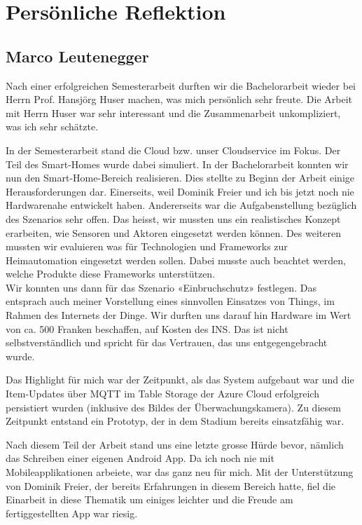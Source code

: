 \pagebreak
\section{Persönliche Reflektion}

\subsection*{Marco Leutenegger}
Nach einer erfolgreichen Semesterarbeit durften wir die Bachelorarbeit wieder bei Herrn Prof. Hansjörg Huser machen, was mich persönlich sehr freute. Die Arbeit mit Herrn Huser war sehr interessant und die Zusammenarbeit unkompliziert, was ich sehr schätzte.

In der Semesterarbeit stand die Cloud bzw. unser Cloudservice im Fokus. Der Teil des Smart-Homes wurde dabei simuliert. In der Bachelorarbeit konnten wir nun den Smart-Home-Bereich realisieren. Dies stellte zu Beginn der Arbeit einige Herausforderungen dar. Einerseits, weil Dominik Freier und ich bis jetzt noch nie Hardwarenahe entwickelt haben. Andererseits war die Aufgabenstellung bezüglich des Szenarios sehr offen. Das heisst, wir mussten uns ein realistisches Konzept erarbeiten, wie Sensoren und Aktoren eingesetzt werden können. Des weiteren mussten wir evaluieren was für Technologien und Frameworks zur Heimautomation eingesetzt werden sollen. Dabei musste auch beachtet werden, welche Produkte diese Frameworks unterstützen. \\
Wir konnten uns dann für das Szenario «Einbruchschutz» festlegen. Das entsprach auch meiner Vorstellung eines sinnvollen Einsatzes von Things, im Rahmen des Internets der Dinge. Wir durften uns darauf hin Hardware im Wert von ca. 500 Franken beschaffen, auf Kosten des INS. Das ist nicht selbstverständlich und spricht für das Vertrauen, das uns entgegengebracht wurde.

Das Highlight für mich war der Zeitpunkt, als das System aufgebaut war und die Item-Updates über MQTT im Table Storage der Azure Cloud erfolgreich persistiert wurden (inklusive des Bildes der Überwachungskamera). Zu diesem Zeitpunkt entstand ein Prototyp, der in dem Stadium bereits einsatzfähig war.

Nach diesem Teil der Arbeit stand uns eine letzte grosse Hürde bevor, nämlich das Schreiben einer eigenen Android App. Da ich noch nie mit Mobileapplikationen arbeiete, war das ganz neu für mich. Mit der Unterstützung von Dominik Freier, der bereits Erfahrungen in diesem Bereich hatte, fiel die Einarbeit in diese Thematik um einiges leichter und die Freude am fertiggestellten App war riesig.

